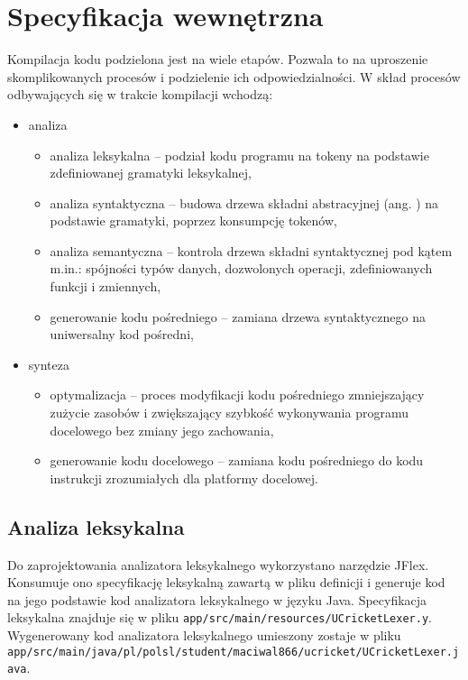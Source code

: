 \chapter{Specyfikacja wewnętrzna}
\label{ch:05}
Kompilacja kodu podzielona jest na wiele etapów. Pozwala to na uproszenie skomplikowanych procesów i podzielenie ich odpowiedzialności. W skład procesów odbywających się w trakcie kompilacji wchodzą:
\begin{itemize}
\item analiza
\begin{itemize}
\item analiza leksykalna -- podział kodu programu na tokeny na podstawie zdefiniowanej gramatyki leksykalnej\cite{appelModernCompilerImplementation2002},
\item analiza syntaktyczna -- budowa drzewa składni abstracyjnej\cite{appelModernCompilerImplementation2002} (ang. ) na podstawie gramatyki, poprzez konsumpcję tokenów\cite{appelModernCompilerImplementation2002},
\item analiza semantyczna -- kontrola drzewa składni syntaktycznej pod kątem m.in.: spójności typów danych, dozwolonych operacji, zdefiniowanych funkcji i zmiennych\cite{nystromCraftingInterpreters2021},
\item generowanie kodu pośredniego -- zamiana drzewa syntaktycznego na uniwersalny kod pośredni,
\end{itemize}
\item synteza
\begin{itemize}
\item optymalizacja -- proces modyfikacji kodu pośredniego zmniejszający zużycie zasobów i zwiększający szybkość wykonywania programu docelowego bez zmiany jego zachowania,
\item generowanie kodu docelowego -- zamiana kodu pośredniego do kodu instrukcji zrozumiałych dla platformy docelowej.
\end{itemize}
\end{itemize}

\section{Analiza leksykalna}
Do zaprojektowania analizatora leksykalnego wykorzystano narzędzie JFlex. Konsumuje ono specyfikację leksykalną zawartą w pliku definicji i generuje kod na jego podstawie kod analizatora leksykalnego w języku Java. Specyfikacja leksykalna znajduje się w pliku \lstinline|app/src/main/resources/UCricketLexer.y|. Wygenerowany kod analizatora leksykalnego umieszony zostaje w pliku \lstinline|app/src/main/java/pl/polsl/student/maciwal866/ucricket/UCricketLexer.java|.

